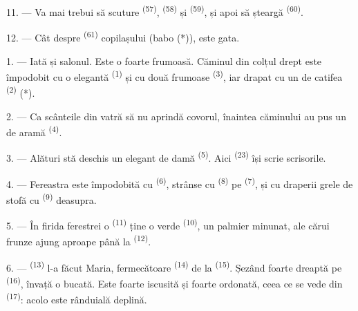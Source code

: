 

11. --- Va mai trebui să scuture  \textsuperscript{(57)},
 \textsuperscript{(58)} și 
\textsuperscript{(59)}, și apoi să șteargă 
\textsuperscript{(60)}.

12. --- Cât despre  \textsuperscript{(61)} copilașului (babo (*)),
este gata.

\VUsaut{5.0mm}
\VUsaut{3.0mm}

1. --- Iată și salonul. Este o  foarte frumoasă. Căminul din colțul
drept este împodobit cu o  elegantă \textsuperscript{(1)} și cu
două  frumoase \textsuperscript{(3)}, iar drapat cu un
 de catifea \textsuperscript{(2)} (*).

2. --- Ca scânteile din vatră să nu aprindă covorul, înaintea căminului au pus un
 de aramă \textsuperscript{(4)}.

3. --- Alături stă deschis un  elegant de damă \textsuperscript{(5)}.
Aici  \textsuperscript{(23)} își scrie scrisorile.

4. --- Fereastra este împodobită cu  \textsuperscript{(6)},
strânse cu  \textsuperscript{(8)} pe 
\textsuperscript{(7)}, și cu draperii grele de stofă cu 
\textsuperscript{(9)} deasupra.

5. --- În firida ferestrei o  \textsuperscript{(11)} ține o
 verde \textsuperscript{(10)}, un palmier minunat, ale cărui frunze
ajung aproape până la  \textsuperscript{(12)}.

6. ---  \textsuperscript{(13)} l-a făcut Maria,
 fermecătoare \textsuperscript{(14)} de la 
\textsuperscript{(15)}. Șezând foarte dreaptă pe 
\textsuperscript{(16)}, învață o bucată. Este foarte iscusită și foarte ordonată,
ceea ce se vede din  \textsuperscript{(17)}: acolo
este rânduială deplină.

